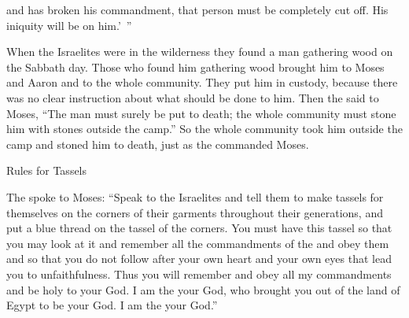{and has broken
his commandment,
that person must be completely cut off.
His iniquity will be on him.’ ”
\par }{\PP {}When
the Israelites
were in the wilderness
they found
a man
gathering
wood
on the Sabbath
day.
Those
who found
him gathering
wood
brought him to
Moses
and Aaron
and to
the whole
community.
They put
him in custody,
because
there was no
clear
instruction about what
should be done to him.
Then the
{}
said
to Moses,
“The man
must
surely be put to death;
the whole
community
must stone
him with stones
outside
the camp.”
So
the whole
community
took
him outside
the camp
and stoned
him to death,
just
as the
{}
commanded
Moses.
\par }{\SH Rules for Tassels
\par }{\PP {}The
{}
spoke to
Moses:
“Speak
to
the Israelites
and tell
them to
make
tassels
for themselves on
the corners
of their garments
throughout their generations,
and put
a blue
thread
on
the tassel
of the corners.
You must have
this tassel
so that you may look
at it and remember
all
the commandments
of the {}
and obey
them and so
that you do not
follow
after
your own heart
and your own
eyes
that
lead you
to unfaithfulness.
Thus
you will remember
and obey
all
my commandments
and be
holy
to your God.
I am
the {}
your God,
who
brought you out
of the land
of Egypt
to be
your God.
I am
the {}
your God.”


}
